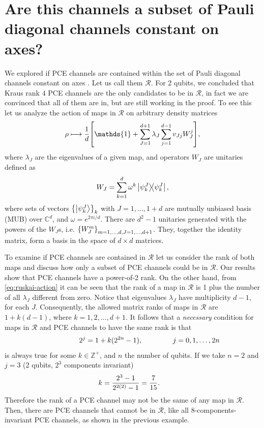 \documentclass[11pt,dvipsnames]{article} %
\newcommand{\R}{\mathcal{R}}
\newcommand{\1}{\mathds{1}}
\begin{document}
\section*{Are this channels a subset of Pauli diagonal channels constant on axes?} %
We explored if PCE channels are contained within the set of Pauli diagonal
channels constant on axes \cite{nathanson2007pauli}. Let us call them
$\mathcal{R}$. For 2 qubits, we concluded that Kraus rank $4$ 
PCE channels are the only candidates to
be in $\mathcal{R}$, in fact we are convinced that all of them are in, but are
still working in the proof. 
To see this let us analyze the action of maps in $\R$ 
on arbitrary density matrices
\begin{align}
	\rho \longmapsto \frac{1}{d}\qty[\1 + \sum _{J=1}^{d+1} \lambda_J
	\sum _{j=1}^{d-1}	v_{Jj}W_J^j],
	\label{eq:ruskai-action}
\end{align}
where $\lambda_J$ are the eigenvalues of a given map, and operators $W_J$ are unitaries defined as
\begin{equation}
	W_J = \sum _{k=1}^{d}\omega^k \dyad{\psi_k^J}{\psi_k^J}, 
\end{equation}
where sets of vectors $\qty{\ket{\psi_k^J}}_k$ with $J=1,\dots, 1+d$ are mutually unbiased basis (MUB) over $\mathbb{C}^d$, and $\omega = e^{2\pi i/d}$. There are $d^2-1$ unitaries generated with the powers of the $W_J$s, i.e.
$\qty{W_J^m}_{m=1,\ldots,d,J=1,\ldots,d+1}$. They, together the identity matrix, form a basis in the space of $d\times d$ matrices.

 

To examine if PCE channels are contained in $\R$ let us consider
the rank of both maps and discuss how only a subset of PCE channels
could be in $\R$. Our results show that PCE channels have 
a power-of-2 rank. On the other hand, from \eqref{eq:ruskai-action} it
can be seen that the rank of a map in $\R$ is 1 plus 
the number of all $\lambda_J$ different from zero. Notice that eigenvalues $\lambda_J$ have multiplicity $d-1$, for each $J$. Consequently, the allowed matrix ranks 
of maps in $\R$ are $1 + k(d-1)$, where $k = 1,2,\ldots,d+1$. It follows
that a \textit{necessary} condition for maps in $\R$ and PCE channels to have the 
same rank is that
\begin{align}
	\hspace{2cm}2^j&=1 + k(2^{2n}-1),	\hspace{1.5cm} j=0,1,\ldots,2n
\end{align}
is always true for some $k\in \mathbb{Z^+}$, and $n$ the number 
of qubits. If we take $n=2$ and $j=3$ 
(2 qubits, $2^3$ components invariant)
\begin{align}
	k&= \frac{2^3-1}{2^{2\qty(2)}-1}=\frac{7}{15}.
\end{align}
Therefore the rank of a PCE channel may not be the same of any map in $\R$.
Then, there are PCE channels that cannot be in $\R$, like
all 8-components-invariant PCE channels, as shown in the previous example. 
\end{document}
